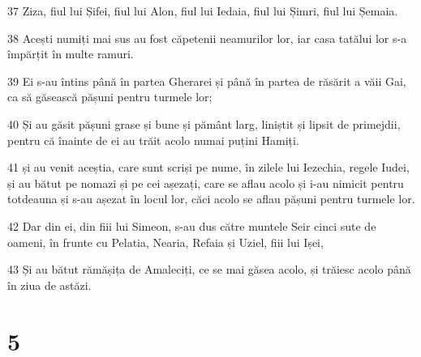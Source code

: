 \par 37 Ziza, fiul lui Șifei, fiul lui Alon, fiul lui Iedaia, fiul lui Șimri, fiul lui Șemaia.
\par 38 Acești numiți mai sus au fost căpetenii neamurilor lor, iar casa tatălui lor s-a împărțit în multe ramuri.
\par 39 Ei s-au întins până în partea Gherarei și până în partea de răsărit a văii Gai, ca să găsească pășuni pentru turmele lor;
\par 40 Și au găsit pășuni grase și bune și pământ larg, liniștit și lipsit de primejdii, pentru că înainte de ei au trăit acolo numai puțini Hamiți.
\par 41 și au venit aceștia, care sunt scriși pe nume, în zilele lui Iezechia, regele Iudei, și au bătut pe nomazi și pe cei așezați, care se aflau acolo și i-au nimicit pentru totdeauna și s-au așezat în locul lor, căci acolo se aflau pășuni pentru turmele lor.
\par 42 Dar din ei, din fiii lui Simeon, s-au dus către muntele Seir cinci sute de oameni, în frunte cu Pelatia, Nearia, Refaia și Uziel, fiii lui Ișei,
\par 43 Și au bătut rămășița de Amaleciți, ce se mai găsea acolo, și trăiesc acolo până în ziua de astăzi.

\chapter{5}

